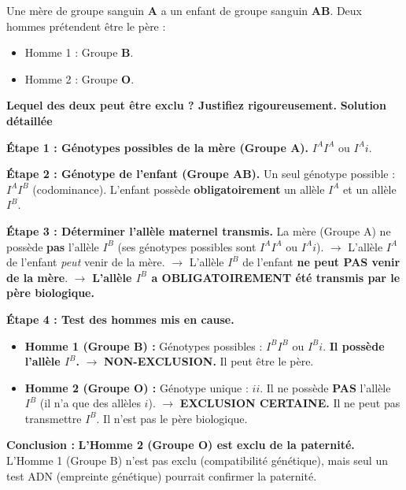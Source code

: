 \documentclass[11pt]{article}
\begin{document}
\begin{exoresolu}
Une mère de groupe sanguin \textbf{A} a un enfant de groupe sanguin \textbf{AB}. Deux hommes prétendent être le père :
\begin{itemize}
    \item Homme 1 : Groupe \textbf{B}.
    \item Homme 2 : Groupe \textbf{O}.
\end{itemize}
\textbf{Lequel des deux peut être exclu ? Justifiez rigoureusement.}
\tcblower
\textbf{Solution détaillée}

\textbf{Étape 1 : Génotypes possibles de la mère (Groupe A).}
$I^A I^A$ ou $I^A i$.

\textbf{Étape 2 : Génotype de l'enfant (Groupe AB).}
Un seul génotype possible : \textbf{$I^A I^B$} (codominance).
L'enfant possède \textbf{obligatoirement} un allèle $I^A$ et un allèle $I^B$.

\textbf{Étape 3 : Déterminer l'allèle maternel transmis.}
La mère (Groupe A) ne possède \textbf{pas} l'allèle $I^B$ (ses génotypes possibles sont $I^A I^A$ ou $I^A i$).
$\rightarrow$ L'allèle $I^A$ de l'enfant \emph{peut} venir de la mère.
$\rightarrow$ L'allèle $I^B$ de l'enfant \textbf{ne peut PAS venir de la mère}.
$\rightarrow$ \textbf{L'allèle $I^B$ a OBLIGATOIREMENT été transmis par le père biologique.}

\textbf{Étape 4 : Test des hommes mis en cause.}
\begin{itemize}
    \item \textbf{Homme 1 (Groupe B) :} Génotypes possibles : $I^B I^B$ ou $I^B i$. \textbf{Il possède l'allèle $I^B$.} $\rightarrow$ \textbf{NON-EXCLUSION.} Il peut être le père.
    \item \textbf{Homme 2 (Groupe O) :} Génotype unique : \textbf{$ii$}. Il ne possède \textbf{PAS} l'allèle $I^B$ (il n'a que des allèles $i$). $\rightarrow$ \textbf{EXCLUSION CERTAINE.} Il ne peut pas transmettre $I^B$. Il n'est pas le père biologique.
\end{itemize}

\textbf{Conclusion :} \textbf{L'Homme 2 (Groupe O) est exclu de la paternité.} L'Homme 1 (Groupe B) n'est pas exclu (compatibilité génétique), mais seul un test ADN (empreinte génétique) pourrait confirmer la paternité.
\end{exoresolu}
\end{document}
